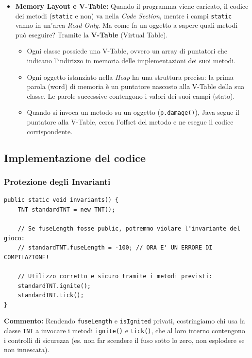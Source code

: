 \documentclass[12pt, a4paper]{article}
\begin{document}
\begin{itemize}
    \item \textbf{Memory Layout e V-Table:}
    Quando il programma viene caricato, il codice dei metodi (\texttt{static} e non) va nella \textit{Code Section}, mentre i campi \texttt{static} vanno in un'area \textit{Read-Only}.
    Ma come fa un oggetto a sapere quali metodi può eseguire? Tramite la \textbf{V-Table} (Virtual Table).
    \begin{itemize}
        \item Ogni classe possiede una V-Table, ovvero un array di puntatori che indicano l'indirizzo in memoria delle implementazioni dei suoi metodi.
        \item Ogni oggetto istanziato nella \textit{Heap} ha una struttura precisa: la prima parola (word) di memoria è un puntatore nascosto alla V-Table della sua classe. Le parole successive contengono i valori dei suoi campi (stato).
        \item Quando si invoca un metodo su un oggetto (\texttt{p.damage()}), Java segue il puntatore alla V-Table, cerca l'offset del metodo e ne esegue il codice corrispondente.
    \end{itemize}
\end{itemize}

\newpage

\subsection{Implementazione del codice}

\subsubsection{Protezione degli Invarianti}
\begin{verbatim}
public static void invariants() {
    TNT standardTNT = new TNT();
    
    // Se fuseLength fosse public, potremmo violare l'invariante del gioco:
    // standardTNT.fuseLength = -100; // ORA E' UN ERRORE DI COMPILAZIONE!

    // Utilizzo corretto e sicuro tramite i metodi previsti:
    standardTNT.ignite();
    standardTNT.tick();
}
\end{verbatim}
\textbf{Commento:} Rendendo \texttt{fuseLength} e \texttt{isIgnited} privati, costringiamo chi usa la classe \texttt{TNT} a invocare i metodi \texttt{ignite()} e \texttt{tick()}, che al loro interno contengono i controlli di sicurezza (es. non far scendere il fuso sotto lo zero, non esplodere se non innescata).
\end{document}
